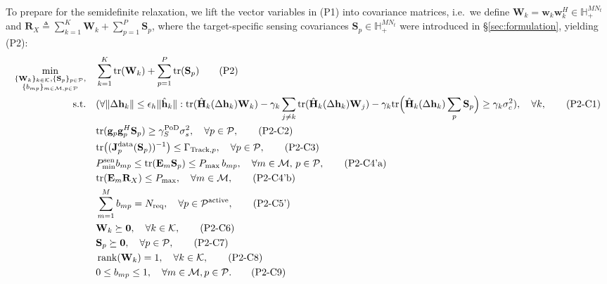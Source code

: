 \documentclass[12pt,a4paper]{article}
\newcommand{\vect}[1]{\mathbf{#1}}
\newcommand{\mat}[1]{\mathbf{#1}}
\newcommand{\tr}{\text{tr}}
\DeclareMathOperator{\rank}{rank}
\begin{document}
To prepare for the semidefinite relaxation, we lift the vector variables in (P1) into covariance matrices, i.e.\ we define $\mat{W}_k = \vect{w}_k \vect{w}_k^H \in \mathbb{H}_+^{MN_t}$ and $\mat{R}_X \triangleq \sum_{k=1}^K \mat{W}_k + \sum_{p=1}^P \mat{S}_p$, where the target-specific sensing covariances $\mat{S}_p \in \mathbb{H}_+^{MN_t}$ were introduced in \S\ref{sec:formulation}, yielding (P2):
\begin{align}
\min_{\substack{\{\mat{W}_k\}_{k\in\mathcal{K}}, \{\mat{S}_p\}_{p\in\mathcal{P}}, \\ \{b_{mp}\}_{m\in\mathcal{M},p\in\mathcal{P}}}} \quad
& \sum_{k=1}^K \tr(\mat{W}_k) + \sum_{p=1}^P \tr(\mat{S}_p) \tag{P2} \\
\text{s.t.} \quad
& (\forall \|\Delta\vect{h}_k\| \leq \epsilon_h \|\hat{\vect{h}}_k\|: \tr(\hat{\mat{H}}_k(\Delta\vect{h}_k) \mat{W}_k) - \gamma_k \sum_{j \neq k} \tr(\hat{\mat{H}}_k(\Delta\vect{h}_k) \mat{W}_j) - \gamma_k \tr\Big(\hat{\mat{H}}_k(\Delta\vect{h}_k) \sum_p \mat{S}_p\Big) \geq \gamma_k \sigma_c^2), \quad \forall k, \tag{P2-C1} \\
& \tr(\vect{g}_p \vect{g}_p^H \mat{S}_p) \geq \gamma_S^{\text{PoD}} \sigma_s^2, \quad \forall p \in \mathcal{P}, \tag{P2-C2} \\
& \tr\big((\mat{J}_p^{\text{data}}(\mat{S}_p))^{-1}\big) \leq \Gamma_{\text{Track},p}, \quad \forall p \in \mathcal{P}, \tag{P2-C3} \label{eq:p2c3} \\
& P_{\min}^{\rm sen}b_{mp}\leq\tr(\mat{E}_m \mat{S}_p) \leq P_{\max} \, b_{mp}, \quad \forall m \in \mathcal{M}, \, p \in \mathcal{P}, \tag{P2-C4'a} \\
& \tr(\mat{E}_m \mat{R}_X) \leq P_{\max}, \quad \forall m \in \mathcal{M}, \tag{P2-C4'b} \\
& \sum_{m=1}^{M} b_{mp} = N_{\text{req}}, \quad \forall p \in \mathcal{P}^{\text{active}}, \tag{P2-C5'} \\
& \mat{W}_k \succeq \mat{0}, \quad \forall k \in \mathcal{K}, \tag{P2-C6} \\
& \mat{S}_p \succeq \mat{0}, \quad \forall p \in \mathcal{P}, \tag{P2-C7} \\
& \rank(\mat{W}_k) = 1, \quad \forall k \in \mathcal{K}, \tag{P2-C8} \\
& 0 \leq b_{mp} \leq 1, \quad \forall m \in \mathcal{M}, p \in \mathcal{P}. \tag{P2-C9}
\end{align}
\end{document}

